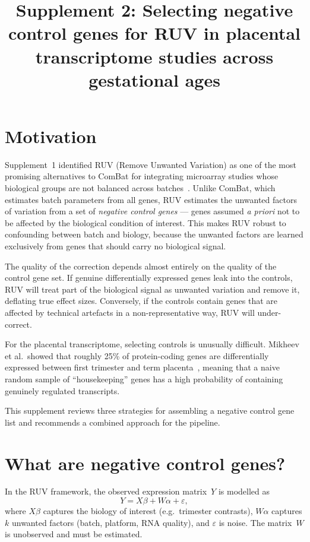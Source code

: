 \documentclass[11pt,a4paper]{article}
\title{Supplement 2: Selecting negative control genes for RUV
  in placental transcriptome studies across gestational ages}
\author{}
\date{}
\begin{document}
\maketitle

\section*{Motivation}

Supplement~1 identified RUV (Remove Unwanted Variation) as one of the
most promising alternatives to ComBat for integrating microarray
studies whose biological groups are not balanced across
batches~\cite{gagnonbartsch2012,risso2014}.  Unlike ComBat, which
estimates batch parameters from all genes, RUV estimates the unwanted
factors of variation from a set of \emph{negative control genes} ---
genes assumed \emph{a priori} not to be affected by the biological
condition of interest.  This makes RUV robust to confounding between
batch and biology, because the unwanted factors are learned exclusively
from genes that should carry no biological signal.

The quality of the correction depends almost entirely on the quality of
the control gene set.  If genuine differentially expressed genes leak
into the controls, RUV will treat part of the biological signal as
unwanted variation and remove it, deflating true effect sizes.
Conversely, if the controls contain genes that are affected by
technical artefacts in a non-representative way, RUV will under-correct.

For the placental transcriptome, selecting controls is unusually
difficult.  Mikheev et al.\ showed that roughly 25\% of protein-coding
genes are differentially expressed between first trimester and term
placenta~\cite{mikheev2012}, meaning that a naive random sample of
``housekeeping'' genes has a high probability of containing genuinely
regulated transcripts.

This supplement reviews three strategies for assembling a negative
control gene list and recommends a combined approach for the pipeline.


\section{What are negative control genes?}

In the RUV framework, the observed expression matrix~$Y$ is modelled
as
\[
  Y = X\beta + W\alpha + \varepsilon,
\]
where $X\beta$ captures the biology of interest (e.g.\ trimester
contrasts), $W\alpha$ captures $k$ unwanted factors (batch,
platform, RNA quality), and $\varepsilon$ is noise.  The matrix~$W$
is unobserved and must be estimated.
\end{document}
